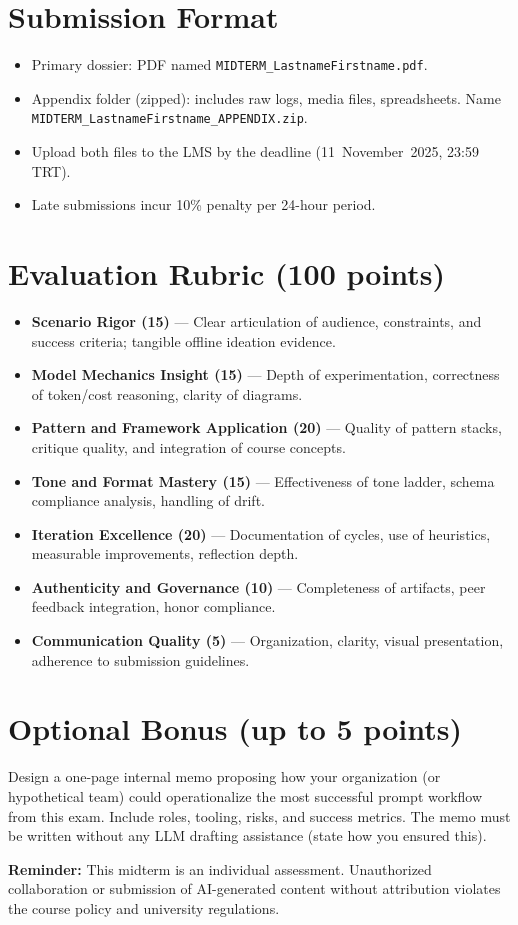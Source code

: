 \documentclass[11pt]{article}
\begin{document}
\section{Submission Format}
\begin{itemize}
    \item Primary dossier: PDF named \texttt{MIDTERM\_LastnameFirstname.pdf}.
    \item Appendix folder (zipped): includes raw logs, media files, spreadsheets. Name \texttt{MIDTERM\_LastnameFirstname\_APPENDIX.zip}.
    \item Upload both files to the LMS by the deadline (11~November~2025, 23:59 TRT).
    \item Late submissions incur 10\% penalty per 24-hour period.
\end{itemize}

\section{Evaluation Rubric (100 points)}
\begin{itemize}[leftmargin=*]
    \item \textbf{Scenario Rigor (15)} --- Clear articulation of audience, constraints, and success criteria; tangible offline ideation evidence.
    \item \textbf{Model Mechanics Insight (15)} --- Depth of experimentation, correctness of token/cost reasoning, clarity of diagrams.
    \item \textbf{Pattern and Framework Application (20)} --- Quality of pattern stacks, critique quality, and integration of course concepts.
    \item \textbf{Tone and Format Mastery (15)} --- Effectiveness of tone ladder, schema compliance analysis, handling of drift.
    \item \textbf{Iteration Excellence (20)} --- Documentation of cycles, use of heuristics, measurable improvements, reflection depth.
    \item \textbf{Authenticity and Governance (10)} --- Completeness of artifacts, peer feedback integration, honor compliance.
    \item \textbf{Communication Quality (5)} --- Organization, clarity, visual presentation, adherence to submission guidelines.
\end{itemize}

\section*{Optional Bonus (up to 5 points)}
Design a one-page internal memo proposing how your organization (or hypothetical team) could operationalize the most successful prompt workflow from this exam. Include roles, tooling, risks, and success metrics. The memo must be written without any LLM drafting assistance (state how you ensured this).

\vfill
\noindent\textbf{Reminder:} This midterm is an individual assessment. Unauthorized collaboration or submission of AI-generated content without attribution violates the course policy and university regulations.
\end{document}
